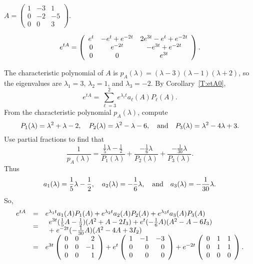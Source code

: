 \documentclass{ximera}
\begin{document}
\begin{exercise} \label{c12.1.6d}
$A = \left(\begin{array}{rrr} 1 & -3 & 1\\ 0 & -2 & -5 \\ 0 & 0 & 3
\end{array}\right)$.

\begin{solution}
\ans
\[
e^{tA} =
\left(\begin{array}{ccc} e^t & -e^t + e^{-2t} & 2e^{3t} - e^t + e^{-2t} \\ 0 & e^{-2t} & -e^{3t} + e^{-2t} \\ 0 & 0 & e^{3t}\end{array}\right).
\]

\soln The characteristic polynomial of $A$ is
$p_A(\lambda) = (\lambda - 3)(\lambda - 1)(\lambda + 2)$, so the
eigenvalues are $\lambda_1 = 3$, $\lambda_2 = 1$, and $\lambda_3 = -2$.
By Corollary~\ref{T:etA0},
\[
e^{tA} = \sum_{\ell = 3}^2 e^{\lambda_\ell t}a_\ell(A)P_\ell(A).
\]
From the characteristic polynomial $p_A(\lambda)$, compute
\[
P_1(\lambda) = \lambda^2 + \lambda - 2, \quad
P_2(\lambda) = \lambda^2 - \lambda - 6, \quad\mbox{and}\quad
P_3(\lambda) = \lambda^2 - 4\lambda + 3.
\]
Use partial fractions to find that
\[
\frac{1}{p_A(\lambda)} =
\frac{\frac{1}{5}\lambda - \frac{1}{2}}{P_1(\lambda)}
+ \frac{-\frac{1}{6}\lambda}{P_2(\lambda)}
+ \frac{-\frac{1}{30}\lambda}{P_3(\lambda)}.
\]
Thus
\[
a_1(\lambda) = \frac{1}{5}\lambda - \frac{1}{2}, \quad
a_2(\lambda) = -\frac{1}{6}\lambda, \quad\mbox{and}\quad
a_3(\lambda) = -\frac{1}{30}\lambda.
\]
So,
\[
\begin{array}{rcl}
e^{tA} & = & e^{\lambda_1 t}a_1(A)P_1(A) + e^{\lambda_2 t}a_2(A)P_2(A)
+ e^{\lambda_3 t}a_3(A)P_3(A) \\
& = &
\begin{array}{l} e^{3t}(\frac{1}{5}A - \frac{1}{2})(A^2 + A - 2I_3)
+ e^t(-\frac{1}{6}A)(A^2 - A - 6I_3) \\
+\; e^{-2t}(-\frac{1}{30}A)(A^2 - 4A + 3I_2) \end{array} \\
& = & e^{3t}\left(\begin{array}{rrr} 0 & 0 & 2 \\ 0 & 0 & -1 \\ 0 & 0 & 1\end{array}\right)
+ e^t\left(\begin{array}{rrr} 1 & -1 & -3 \\ 0 & 0 & 0 \\ 0 & 0 & 0\end{array}\right)
+ e^{-2t}\left(\begin{array}{rrr} 0 & 1 & 1 \\ 0 & 1 & 1 \\ 0 & 0 & 0\end{array}\right).
\end{array}
\]

\end{solution}
\end{exercise}
\end{document}
